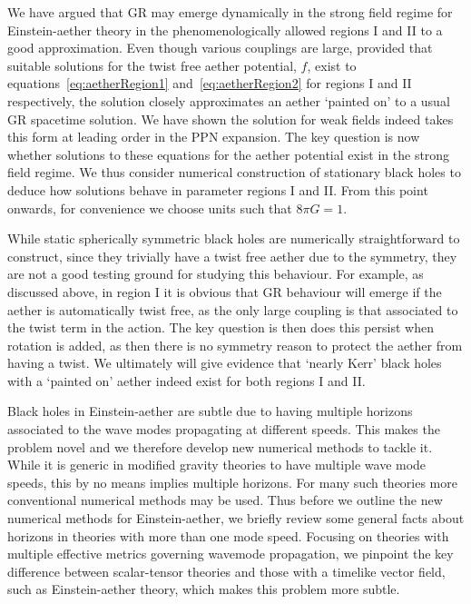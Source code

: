 \documentclass[12pt]{article}
\numberwithin{equation}{section}
\begin{document}
We have argued that GR may emerge dynamically in the strong field regime for Einstein-aether theory in the phenomenologically allowed regions I and II to a good approximation. Even though various couplings are large, provided that suitable solutions  for the twist free aether potential, $f$, exist to equations~\eqref{eq:aetherRegion1} and~\eqref{eq:aetherRegion2} for regions I and II respectively, the solution closely approximates an aether `painted on' to a usual GR spacetime solution.
We have shown the solution for weak fields indeed takes this form at leading order in the PPN expansion. The key question is now whether solutions to these equations for the aether potential exist in the strong field regime. We thus consider numerical construction of stationary black holes to deduce how solutions behave in parameter regions I and II. From this point onwards, for convenience we choose units such that $8 \pi G = 1$.

While static spherically symmetric black holes are numerically straightforward to construct, since they trivially have a twist free aether due to the symmetry, they are not a good testing ground for studying this behaviour. For example, as discussed above, in region I it is obvious that GR behaviour will emerge if the aether is automatically twist free, as the only large coupling is that associated to the twist term in the action. The key question is then does this persist when rotation is added, as then there is no symmetry reason to protect the aether from having a twist. 
We ultimately will give evidence that `nearly Kerr' black holes with a `painted on' aether indeed exist for both regions I and II.  

Black holes in Einstein-aether are subtle due to having multiple horizons associated to the wave modes propagating at different speeds. This makes the problem novel and we therefore develop new numerical methods to tackle it. 
While it is generic in modified gravity theories to have multiple wave mode speeds, this by no means implies multiple horizons. For many such theories more conventional numerical methods may be used. Thus before we 
outline the new numerical methods for Einstein-aether, we briefly review some general facts about horizons in 
theories with more than one mode speed.
Focusing on theories with multiple effective metrics governing wavemode propagation,
we pinpoint the key difference 
between scalar-tensor theories 
and those with a timelike vector field, 
such as Einstein-aether theory, which makes this problem more subtle.
\end{document}
